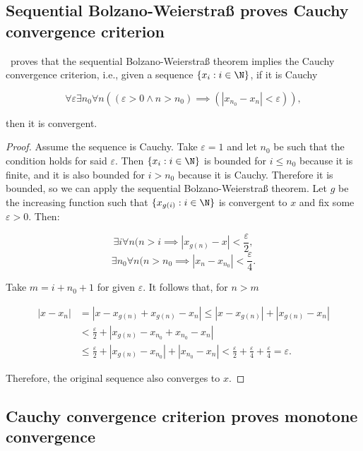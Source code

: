 \documentclass[../main.tex]{memoir}
\begin{document}
\subsection{Sequential Bolzano-Weierstra{\ss} proves Cauchy convergence criterion}

\begin{theorem}
  \label{thm:bw-cc}
  \rca\ proves that the sequential Bolzano-Weierstra{\ss} theorem implies the Cauchy convergence criterion, i.e., given a sequence $\{x_i: i \in \N\}$, if it is Cauchy

  \[ \forall \varepsilon \exists n_0 \forall n ((\varepsilon > 0 \land n > n_0) \implies (|x_{n_0} - x_n| < \varepsilon)), \]

  then it is convergent.
\end{theorem}
\begin{proof}
  Assume the sequence is Cauchy. Take $\varepsilon = 1$ and let $n_0$ be such that the condition holds for said $\varepsilon$. Then $\{x_i: i \in \N\}$ is bounded for $i \le n_0$ because it is finite, and it is also bounded for $i > n_0$ because it is Cauchy. Therefore it is bounded, so we can apply the sequential Bolzano-Weierstra{\ss} theorem. Let $g$ be the increasing function such that $\{x_{g(i)}: i \in \N\}$ is convergent to $x$ and fix some $\varepsilon > 0$. Then:

  \[ \exists i \forall n (n > i \implies |x_{g(n)} - x| < \frac{\varepsilon}{2}, \]
  \[ \exists n_0 \forall n (n > n_0 \implies |x_n - x_{n_0}| < \frac{\varepsilon}{4}. \]

  Take $m = i + n_0 + 1$ for given $\varepsilon$. It follows that, for $n > m$

  \begin{equation*}
    \begin{split}
      |x - x_n| & = |x - x_{g(n)} + x_{g(n)} - x_n| \le |x - x_{g(n)}| + |x_{g(n)} - x_n| \\
      & < \frac{\varepsilon}{2} + |x_{g(n)} - x_{n_0} + x_{n_0} - x_n| \\
      & \le \frac{\varepsilon}{2} + |x_{g(n)} - x_{n_0}| + |x_{n_0} - x_n| < \frac{\varepsilon}{2} + \frac{\varepsilon}{4} + \frac{\varepsilon}{4} = \varepsilon.
    \end{split}
  \end{equation*}

  Therefore, the original sequence also converges to $x$.
\end{proof}

\subsection{Cauchy convergence criterion proves monotone convergence}
\end{document}
